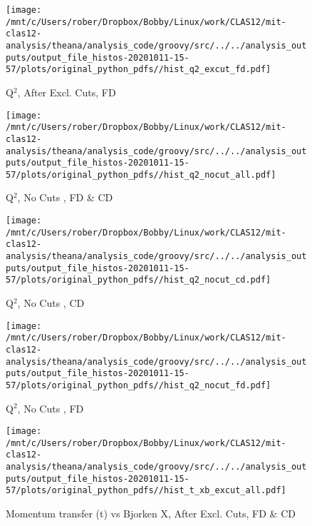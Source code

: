 \documentclass{article}
\begin{document}
\begin{landscape}
    \begin{figure}[h]
        \centering

        \texttt{[image: /mnt/c/Users/rober/Dropbox/Bobby/Linux/work/CLAS12/mit-clas12-analysis/theana/analysis\_code/groovy/src/../../analysis\_outputs/output\_file\_histos-20201011-15-57/plots/original\_python\_pdfs//hist\_q2\_excut\_fd.pdf]}
        \captionsetup{textformat=empty,labelformat=blank}
        \caption{Q$^{2}$, After Excl. Cuts, FD}
    \end{figure}
    \clearpage
    
    \begin{figure}[h]
        \centering

        \texttt{[image: /mnt/c/Users/rober/Dropbox/Bobby/Linux/work/CLAS12/mit-clas12-analysis/theana/analysis\_code/groovy/src/../../analysis\_outputs/output\_file\_histos-20201011-15-57/plots/original\_python\_pdfs//hist\_q2\_nocut\_all.pdf]}
        \captionsetup{textformat=empty,labelformat=blank}
        \caption{Q$^{2}$, No Cuts , FD \& CD}
    \end{figure}
    \clearpage
    
    \begin{figure}[h]
        \centering

        \texttt{[image: /mnt/c/Users/rober/Dropbox/Bobby/Linux/work/CLAS12/mit-clas12-analysis/theana/analysis\_code/groovy/src/../../analysis\_outputs/output\_file\_histos-20201011-15-57/plots/original\_python\_pdfs//hist\_q2\_nocut\_cd.pdf]}
        \captionsetup{textformat=empty,labelformat=blank}
        \caption{Q$^{2}$, No Cuts , CD}
    \end{figure}
    \clearpage
    
    \begin{figure}[h]
        \centering

        \texttt{[image: /mnt/c/Users/rober/Dropbox/Bobby/Linux/work/CLAS12/mit-clas12-analysis/theana/analysis\_code/groovy/src/../../analysis\_outputs/output\_file\_histos-20201011-15-57/plots/original\_python\_pdfs//hist\_q2\_nocut\_fd.pdf]}
        \captionsetup{textformat=empty,labelformat=blank}
        \caption{Q$^{2}$, No Cuts , FD}
    \end{figure}
    \clearpage
    
    \begin{figure}[h]
        \centering

        \texttt{[image: /mnt/c/Users/rober/Dropbox/Bobby/Linux/work/CLAS12/mit-clas12-analysis/theana/analysis\_code/groovy/src/../../analysis\_outputs/output\_file\_histos-20201011-15-57/plots/original\_python\_pdfs//hist\_t\_xb\_excut\_all.pdf]}
        \captionsetup{textformat=empty,labelformat=blank}
        \caption{Momentum transfer (t) vs Bjorken X, After Excl. Cuts, FD \& CD}
    \end{figure}
    \clearpage
    

\end{landscape}
\end{document}
